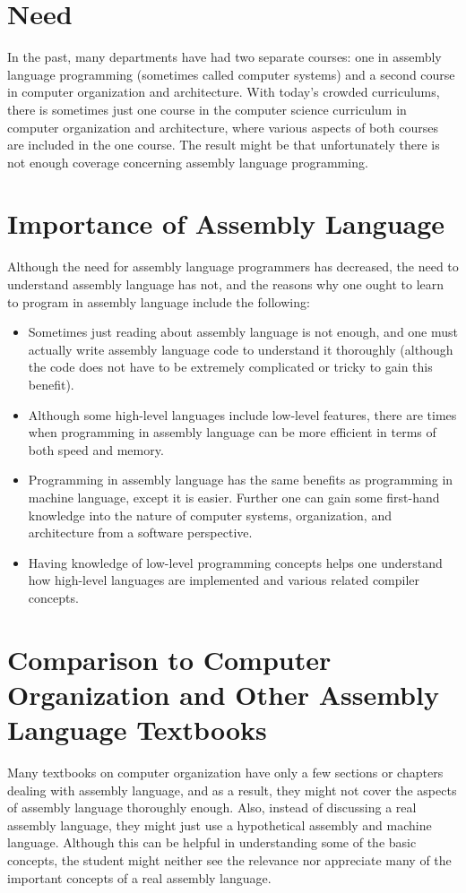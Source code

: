 \documentclass[10pt]{article}
\begin{document}
\section*{Need}
In the past, many departments have had two separate courses: one in assembly language programming (sometimes called computer systems) and a second course in computer organization and architecture. With today's crowded curriculums, there is sometimes just one course in the computer science curriculum in computer organization and architecture, where various aspects of both courses are included in the one course. The result might be that unfortunately there is not enough coverage concerning assembly language programming.

\section*{Importance of Assembly Language}
Although the need for assembly language programmers has decreased, the need to understand assembly language has not, and the reasons why one ought to learn to program in assembly language include the following:

\begin{itemize}
  \item Sometimes just reading about assembly language is not enough, and one must actually write assembly language code to understand it thoroughly (although the code does not have to be extremely complicated or tricky to gain this benefit).
  \item Although some high-level languages include low-level features, there are times when programming in assembly language can be more efficient in terms of both speed and memory.
  \item Programming in assembly language has the same benefits as programming in machine language, except it is easier. Further one can gain some first-hand\\
knowledge into the nature of computer systems, organization, and architecture from a software perspective.
  \item Having knowledge of low-level programming concepts helps one understand how high-level languages are implemented and various related compiler concepts.
\end{itemize}

\section*{Comparison to Computer Organization and Other Assembly Language Textbooks}
Many textbooks on computer organization have only a few sections or chapters dealing with assembly language, and as a result, they might not cover the aspects of assembly language thoroughly enough. Also, instead of discussing a real assembly language, they might just use a hypothetical assembly and machine language. Although this can be helpful in understanding some of the basic concepts, the student might neither see the relevance nor appreciate many of the important concepts of a real assembly language.
\end{document}
